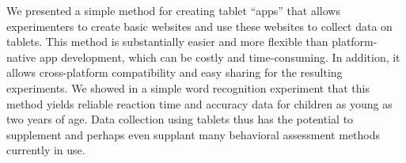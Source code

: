 \documentclass[man,noapacite]{apa2}
\begin{document}
We presented a simple method for creating tablet ``apps'' that allows experimenters to create basic websites and use these websites to collect data on tablets. This method is substantially easier and more flexible than platform-native app development, which can be costly and time-consuming. In addition, it allows cross-platform compatibility and easy sharing for the resulting experiments. We showed in a simple word recognition experiment that this method yields reliable reaction time and accuracy data for children as young as two years of age. Data collection using tablets thus has the potential to supplement and perhaps even supplant many behavioral assessment methods currently in use. 

\newpage



\end{document}
